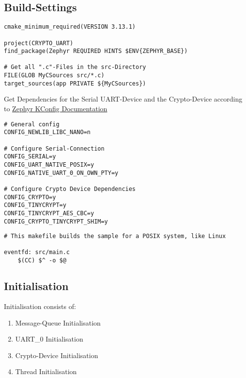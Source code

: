 \pagebreak

\subsection{Build-Settings}

\begin{lstlisting}[caption=CMakelists.txt]
cmake_minimum_required(VERSION 3.13.1)

project(CRYPTO_UART)
find_package(Zephyr REQUIRED HINTS $ENV{ZEPHYR_BASE})

# Get all ".c"-Files in the src-Directory
FILE(GLOB MyCSources src/*.c)
target_sources(app PRIVATE ${MyCSources})
\end{lstlisting}

Get Dependencies for the Serial UART-Device and the Crypto-Device
according to
\href{https://docs.zephyrproject.org/2.4.0/reference/kconfig/index-all.html}
{Zephyr KConfig Documentation}

\begin{lstlisting}[caption=prj.conf]
# General config
CONFIG_NEWLIB_LIBC_NANO=n

# Configure Serial-Connection
CONFIG_SERIAL=y
CONFIG_UART_NATIVE_POSIX=y
CONFIG_NATIVE_UART_0_ON_OWN_PTY=y

# Configure Crypto Device Dependencies
CONFIG_CRYPTO=y
CONFIG_TINYCRYPT=y
CONFIG_TINYCRYPT_AES_CBC=y
CONFIG_CRYPTO_TINYCRYPT_SHIM=y
\end{lstlisting}

\begin{lstlisting}[caption=Makefile.posix]
# This makefile builds the sample for a POSIX system, like Linux

eventfd: src/main.c
	$(CC) $^ -o $@
\end{lstlisting}

\pagebreak

\subsection{Initialisation}

Initialisation consists of:
\begin{enumerate}
	\item Message-Queue Initialisation
	\item UART\_0 Initialisation
	\item Crypto-Device Initialisation
	\item Thread Initialisation
\end{enumerate}

